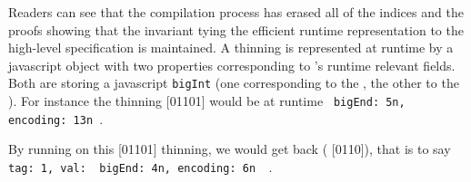 

Readers can see that the compilation process has erased all of the indices
and the proofs
showing that the invariant tying the efficient runtime representation to the
high-level specification is maintained.
%
A thinning is represented at runtime by a javascript object with two properties
corresponding to 's runtime relevant fields. Both are storing a
javascript \texttt{bigInt} (one corresponding to the , the other
to the ).
%
For instance the thinning [01101] would be at runtime
\texttt{{ bigEnd: 5n, encoding: 13n }}.
%

By running  on this [01101] thinning, we would get
back ( [0110]), that is to say
\texttt{{ tag: 1, val: { bigEnd: 4n, encoding: 6n } }}.
